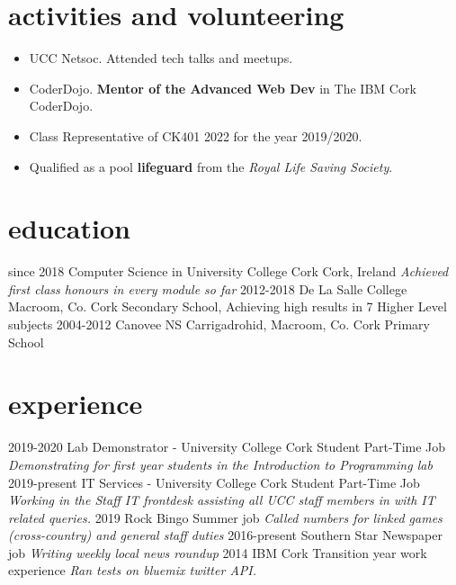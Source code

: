 \documentclass[]{friggeri-cv}
\begin{document}
\section{activities and volunteering}
\begin{itemize}
    \item UCC Netsoc. Attended tech talks and meetups.
    \item CoderDojo. \textbf{Mentor of the Advanced Web Dev} in The IBM Cork CoderDojo.
    \item Class Representative of CK401 2022 for the year 2019/2020.
    \item Qualified as a pool \textbf{lifeguard} from the \textit{Royal Life Saving Society}.
\end{itemize}

\section{education}

\begin{entrylist}
  \entry
    {since 2018}
    {Computer Science in {\normalfont University College Cork}}
    {Cork, Ireland}
    {\emph{Achieved first class honours in every module so far}}
  \entry
    {2012-2018}
    {De La Salle College}
    {Macroom, Co. Cork}
    {Secondary School, Achieving high results in 7 Higher Level subjects}
  \entry
    {2004-2012}
    {Canovee NS}
    {Carrigadrohid, Macroom, Co. Cork}
    {Primary School}
\end{entrylist}

\section{experience}

\begin{entrylist}
  \entry
    {2019-2020}
    {Lab Demonstrator - {\normalfont University College Cork}}
    {Student Part-Time Job}
    {\emph{Demonstrating for first year students in the \textit{Introduction to Programming} lab}}
  \entry
    {2019-present}
    {IT Services - {\normalfont University College Cork}}
    {Student Part-Time Job}
    {\emph{Working in the Staff IT frontdesk assisting all UCC staff members in with IT related queries.}}
  \entry
    {2019}
    {Rock Bingo}
    {Summer job}
    {\emph{Called numbers for linked games (cross-country) and general staff duties}}
  \entry
    {2016-present}
    {Southern Star}
    {Newspaper job}
    {\emph{Writing weekly local news roundup}}
  \entry
    {2014}
    {IBM Cork}
    {Transition year work experience}
    {\emph{Ran tests on bluemix twitter API.}}
\end{entrylist}
\end{document}
